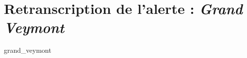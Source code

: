 

\chapter{Retranscription de l'alerte : \emph{Grand Veymont}}
\label{anx:retrans_grand_veymont}
{grand_veymont}










